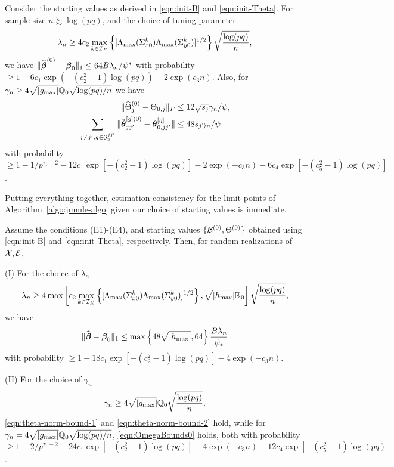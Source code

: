\begin{Theorem}\label{thm:starting-values}
Consider the starting values as derived in \eqref{eqn:init-B} and \eqref{eqn:init-Theta}. For sample size $n \succsim \log(pq)$, and the choice of tuning parameter
%
\[
\lambda_n \geq 4 c_2 \max_{k \in {\cal{I}}_K} \left\{ [\Lambda_{\max} (\Sigma_{x 0}^k) \Lambda_{\max} (\Sigma_{y 0}^k)]^{1/2} \right\}
\sqrt{ \frac{\log (pq)}{n}},
\]
%
we have $\| \widehat {{\boldsymbol{\beta}}}^{(0)} - {\boldsymbol{\beta}}_0 \|_1 \leq 64 B \lambda_n /\psi^*$ with probability $\geq 1 - 6c_1 \exp( -(c_2^2-1) \log(pq)) - 2 \exp(c_3 n)$. Also, for $\gamma_n \geq 4\sqrt{| g_{\max}|} {\mathbb{Q}}_0 \sqrt{ \log (pq)/n}$ we have
%
\begin{align*}
\| \widehat \Theta_j^{(0)} - \Theta_{0,j} \|_F & \leq 12 \sqrt{s_j} \gamma_n / \psi,\\
\sum_{j \neq j', g \in {\cal{G}}_y^{jj'}} \| \hat {{\boldsymbol{\theta}}}_{jj'}^{[g](0)} - {\boldsymbol{\theta}}_{0,jj'}^{[g]} \| & \leq 48 s_j \gamma_n / \psi,
\end{align*}
%
with probability $\geq 1 - 1/p^{\tau_1-2} - 12 c_1 \exp [-(c_2^2-1) \log(pq)] - 2 \exp (- c_3 n) - 6c_4 \exp [-(c_5^2-1) \log(pq)]$.
\end{Theorem}
%

Putting everything together, estimation consistency for the limit points of Algorithm~\ref{algo:jmmle-algo} given our choice of starting values is immediate.

\begin{Corollary}\label{corollary:jmmle-final}
Assume the conditions (E1)-(E4), and starting values $\{ {\cal{B}}^{(0)}, \Theta^{(0)} \}$ obtained using \eqref{eqn:init-B} and \eqref{eqn:init-Theta}, respectively. Then, for random realizations of ${\cal{X}}, {\cal{E}}$,
%

\vspace{1em}
\noindent (I) For the choice of $\lambda_n$
%
$$
\lambda_n \geq 4 \max \left[ c_2 \max_{k \in {\cal{I}}_K} \left\{ [\Lambda_{\max} (\Sigma_{x 0}^k) \Lambda_{\max} (\Sigma_{y 0}^k)]^{1/2} \right\}, \sqrt{| h_{\max}|} {\mathbb{R}}_0 \right] \sqrt{\frac{\log(pq)}{n}},
$$
%
we have
%
$$
\| \widehat {{\boldsymbol{\beta}}} - {\boldsymbol{\beta}}_0 \|_1 \leq \max \left\{ 48 \sqrt{ | h_{\max} |}, 64 \right\} \frac{B \lambda_n}{\psi_*}
$$
%
with probability $\geq 1 - 18 c_1 \exp[-(c_2^2-1) \log(pq)] - 4 \exp( -c_3 n)$.

\vspace{1em}
\noindent (II) For the choice of $\gamma_n$
%
$$
\gamma_n \geq 4 \sqrt{ | g_{\max} |} {\mathbb{Q}}_0 \sqrt{\frac{\log(pq)}{n}},
$$
%
\eqref{eqn:theta-norm-bound-1} and \eqref{eqn:theta-norm-bound-2} hold, while for $\gamma_n = 4 \sqrt{ | g_{\max} |} {\mathbb{Q}}_0 \sqrt{ \log (pq)/n}$, \eqref{eqn:OmegaBounds0} holds, both with probability $\geq 1 - 2/p^{\tau_1-2} - 24 c_1 \exp [-(c_2^2-1) \log(pq)] - 4 \exp (- c_3 n) - 12 c_4 \exp [-(c_5^2-1) \log(pq)]$.
\end{Corollary}

